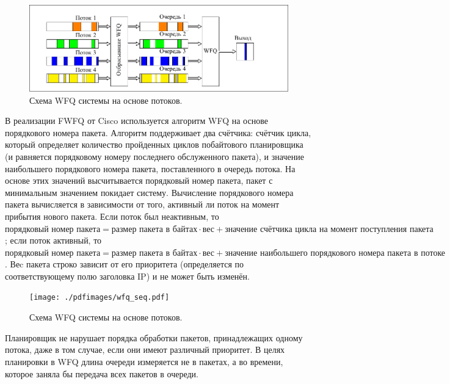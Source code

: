     \begin{figure}[ht!]
		\center
        \includegraphics[scale=1.3]{./pdfimages/fwfq.pdf}
        \caption{Схема WFQ системы на основе потоков.}
		\label{pic:fwfqscheme}
    \end{figure}

	В реализации FWFQ от Cisco используется алгоритм WFQ на основе порядкового номера
	пакета. Алгоритм поддерживает два счётчика: счётчик цикла, который 
	определяет количество пройденных циклов побайтового планировщика (и равняется
	порядковому номеру последнего обслуженного пакета), и значение
	наибольшего порядкового номера пакета, поставленного в очередь потока.
	На основе этих значений высчитывается порядковый номер пакета, пакет
	с минимальным значением покидает систему. Вычисление порядкового номера пакета
	вычисляется в зависимости от того, активный ли поток на момент прибытия нового пакета.
	Если поток был неактивным, то $\textit{порядковый номер пакета} = \textit{размер пакета в байтах} \cdot \textit{вес}
	+ \textit{значение счётчика цикла на момент поступления пакета}$; если поток активный,
	то $\textit{порядковый номер пакета} = \textit{размер пакета в байтах} \cdot \textit{вес}
	+ \textit{значение наибольшего порядкового номера пакета в потоке}$.
	Веc пакета строко зависит от его приоритета (определяется по соответствующему полю заголовка IP)
	и не может быть изменён.\cite{Vagesna}

    \begin{figure}[ht!]
		\center
        \texttt{[image: ./pdfimages/wfq\_seq.pdf]}
        \caption{Схема WFQ системы на основе потоков.}
		\label{pic:fwfqscheme}
    \end{figure}

    Планировщик не нарушает порядка обработки пакетов, принадлежащих одному
    потока, даже в том случае, если они имеют различный приоритет.
    В целях планировки в WFQ длина очереди измеряется не в пакетах, а во времени,
    которое заняла бы передача всех пакетов в очереди.\cite{Vagesna}

	
